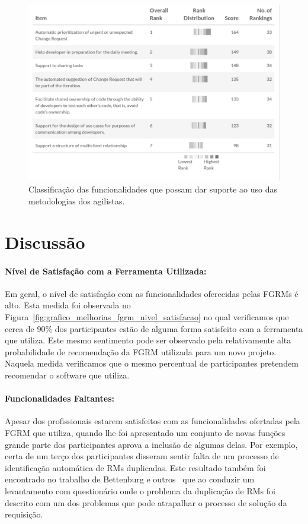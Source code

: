 \begin{figure}[htpb]
	\centering
	\includegraphics[width=0.8\linewidth]{./chapter-pesquisa-com-profissionais/img/grafico_melhorias_fgrm_suporte_particas_ageis.pdf}
	\caption{Classificação das funcionalidades que possam dar suporte ao uso das
	metodologias dos agilistas.}
\label{fig:grafico_melhorias_fgrm_suporte_particas_ageis}
\end{figure}

\section{Discussão}

\paragraph{Nível de Satisfação com a Ferramenta Utilizada:}
\label{par:pesq_profissionais_nivel_de_satisfação}

Em geral, o nível de satisfação com as funcionalidades oferecidas pelas FGRMs é
alto. Esta medida foi observada no
Figura~\ref{fig:grafico_melhorias_fgrm_nivel_satisfacao} no qual verificamos que
cerca de 90\% dos participantes estão de alguma forma satisfeito com a
ferramenta que utiliza. Este mesmo sentimento pode ser observado pela
relativamente alta probabilidade de recomendação da FGRM utilizada para um novo
projeto. Naquela medida verificamos que o mesmo percentual de participantes
pretendem recomendar o software que utiliza.

\paragraph{Funcionalidades Faltantes:}
\label{par:pesq_profissionais_funcionalidades_faltantes}

Apesar dos profissionais estarem satisfeitos com as funcionalidades ofertadas
pela FGRM que utiliza, quando lhe foi apresentado um conjunto de novas funções
grande parte dos participantes aprova a inclusão de algumas delas. Por exemplo,
certa de um terço dos participantes disseram sentir falta de um processo de
identificação automática de RMs duplicadas. Este resultado também foi encontrado
no trabalho de Bettenburg e outros~\cite{bettenburg2008makes} que ao conduzir um
levantamento com questionário onde o problema da duplicação de RMs foi descrito
com um dos problemas que pode atrapalhar o processo de solução da requisição.

